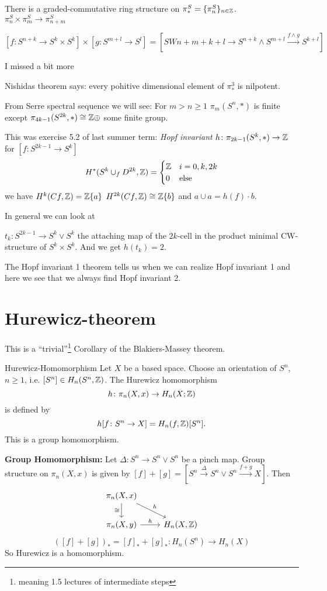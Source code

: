 \documentclass[language=english]{TemplateLecture}
\begin{document}
There is a graded-commutative ring structure on \(\pi_*^S = \{\pi_n^S\}_{n \in \mathbb{Z}}\). \(\pi_n^S \times \pi_m^S \to \pi_{n+m}^S\)

\[[f\colon S^{n+k}\to S^k\times S^k] \times [g \colon S^{m+l}\to S^l] = [SW{n+m+k+l} \to S^{n+k} \wedge S^{m+l} \xrightarrow{f\wedge g} S^{k+l}]\]

I missed a bit more

Nishidas theorem says: every pohitive dimensional element of \(\pi_*^3\) is nilpotent.

From Serre spectral sequence we will see: For \(m > n\geq 1\) \(\pi_m(S^n, *)\) is finite except \(\pi_{4k - 1}(S^{2k}, *) \cong \mathbb{Z} \oplus \) some finite group.

This was exercise 5.2 of last summer term: \emph{Hopf invariant} \(h\colon \pi_{2k-1}(S^k, *) \to \mathbb{Z}\) for \([f\colon S^{2k-1}\to S^k]\)
\[H^*(S^k\cup_f D^{2k}, \mathbb{Z}) = \begin{cases}
    \mathbb{Z} & i = 0,k,2k \\
    0 & \text{else}
\end{cases}\]
we have 
\(H^k(Cf, \mathbb{Z}) = \mathbb{Z}\{a\}\) \(H^{2k}(Cf, \mathbb{Z}) \cong \mathbb{Z}\{b\}\) and \(a \cup a = h(f) \cdot b\).

In general we can look at

\(t_k\colon S^{2k-1}\to S^k\vee S^k\) the attaching map of the \(2k\)-cell in the product minimal CW-structure of \(S^k \times S^k\). And we get \(h(t_k) = 2\).

The Hopf invariant 1 theorem tells us when we can realize Hopf invariant 1 and here we see that we always find Hopf invariant 2.

\section{Hurewicz-theorem}

This is a \enquote{trivial}\footnote{meaning 1.5 lectures of intermediate steps} Corollary of the Blakiers-Massey theorem.

\begin{defi}{}{Hurewicz-Homomorphism}
    Let \(X\) be a based space. Choose an orientation of \(S^n\), \(n \geq 1\), i.e. \([S^n] \in H_n(S^n, \mathbb{Z})\). The Hurewicz homomorphism
    \[h\colon \pi_n(X,x) \to H_n(X;\mathbb{Z})\]
    is defined by
    \[h[f\colon S^n\to X] = H_n(f, \mathbb{Z})[S^n].\]
    This is a group homomorphism.
\end{defi}

\textbf{Group Homomorphism:} Let \(\Delta\colon S^n \to S^n \vee S^n\) be a pinch map.
Group structure on \(\pi_n(X,x)\) is given by \([f]+[g] = [S^n\xrightarrow{\Delta}S^n\vee S^n \xrightarrow{f+g} X]\). Then
\[
\begin{tikzcd}
    \pi_n(X, x) \arrow[d, "\cong"'] \arrow[rd, "h"] & \\
    \pi_n(X, y) \arrow[r, "h"] & H_n(X, \mathbb{Z})
\end{tikzcd}
\]
\[([f]+ [g])_* = [f]_* + [g]_* \colon H_n(S^n) \to H_n(X)\]
So Hurewicz is a homomorphism.
\end{document}
